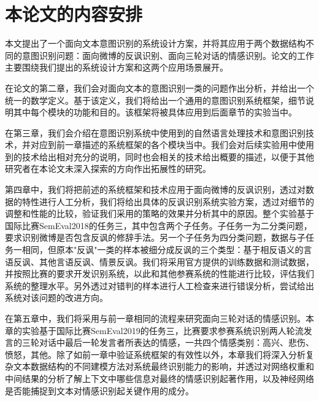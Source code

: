 \section{本论文的内容安排}

本文提出了一个面向文本意图识别的系统设计方案，并将其应用于两个数据结构不同的意图识别问题：面向微博的反讽识别、面向三轮对话的情感识别。论文的工作主要围绕我们提出的系统设计方案和这两个应用场景展开。

在论文的第二章，我们会对面向文本的意图识别一类的问题作出分析，并给出一个统一的数学定义。基于该定义，我们将给出一个通用的意图识别系统框架，细节说明其中每个模块的功能和目的。该框架将被具体应用到后面章节的实验当中。

在第三章，我们会介绍在意图识别系统中使用到的自然语言处理技术和意图识别技术，并对应到前一章描述的系统框架的各个模块当中。我们会对后续实验用中使用到的技术给出相对充分的说明，同时也会相关的技术给出概要的描述，以便于其他研究者在本论文未深入探索的方向作出拓展性的研究。

第四章中，我们将把前述的系统框架和技术应用于面向微博的反讽识别，透过对数据的特性进行人工分析，我们将给出具体的反讽识别系统实验方案，透过对细节的调整和性能的比较，验证我们采用的策略的效果并分析其中的原因。整个实验基于国际比赛SemEval2018的任务三\cite{van2018semeval}，其中包含两个子任务。子任务一为二分类问题，要求识别微博是否包含反讽的修辞手法。另一个子任务为四分类问题，数据与子任务一相同，但原本"反讽"一类的样本被细分成反讽的三个类型：基于相反语义的言语反讽、其他言语反讽、情景反讽。我们将采用官方提供的训练数据和测试数据，并按照比赛的要求开发识别系统，以此和其他参赛系统的性能进行比较，评估我们系统的整理水平。另外透过对错判的样本进行人工检查来进行错误分析，尝试给出系统对该问题的改进方向。

在第五章中，我们将采用与前一章相同的流程来研究面向三轮对话的情感识别。本章的实验基于国际比赛SemEval2019的任务三\cite{SemEval2019Task3}，比赛要求参赛系统识别两人轮流发言的三轮对话中最后一轮发言者所表达的情感，一共四个情感类别：高兴、悲伤、愤怒，其他。除了如前一章中验证系统框架的有效性以外，本章我们将深入分析复杂文本数据结构的不同建模方法对系统最终识别能力的影响，并透过对网络权重和中间结果的分析了解上下文中哪些信息对最终的情感识别起著作用，以及神经网络是否能捕捉到文本对情感识别起关键作用的成分。



















